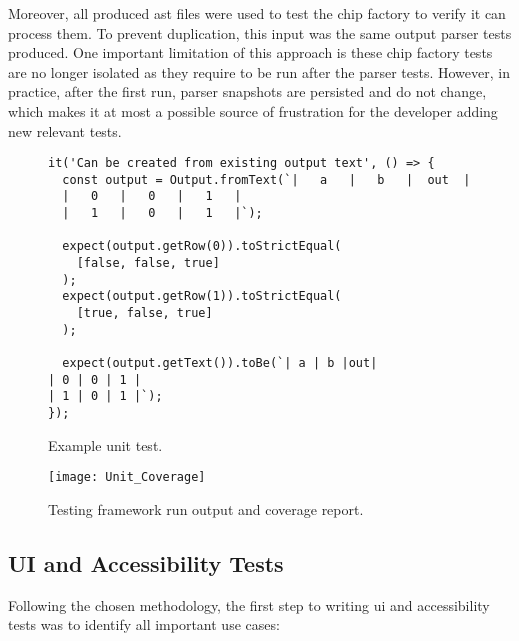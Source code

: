 Moreover, all produced \gls{ast} files were used to test the chip factory to verify it can process them.
To prevent duplication, this input was the same output parser tests produced.
One important limitation of this approach is these chip factory tests are no longer isolated as they require to be run after the parser tests.
However, in practice, after the first run, parser snapshots are persisted and do not change, which makes it at most a possible source of frustration for the developer adding new relevant tests.

\begin{figure}[H]
\centering
\begin{verbatim}
it('Can be created from existing output text', () => {
  const output = Output.fromText(`|   a   |   b   |  out  |
  |   0   |   0   |   1   |
  |   1   |   0   |   1   |`);

  expect(output.getRow(0)).toStrictEqual(
    [false, false, true]
  );
  expect(output.getRow(1)).toStrictEqual(
    [true, false, true]
  );

  expect(output.getText()).toBe(`| a | b |out|
| 0 | 0 | 1 |
| 1 | 0 | 1 |`);
});
\end{verbatim}
    \caption{Example unit test.}
    \label{fig:test-unit-example}
\end{figure}

\begin{figure}[H]
    \texttt{[image: Unit\_Coverage]}
    \caption{Testing framework run output and coverage report.}
    \label{fig:test-coverage}
\end{figure}

\subsection{UI and Accessibility Tests}

Following the chosen methodology, the first step to writing \gls{ui} and accessibility tests was to identify all important use cases:

